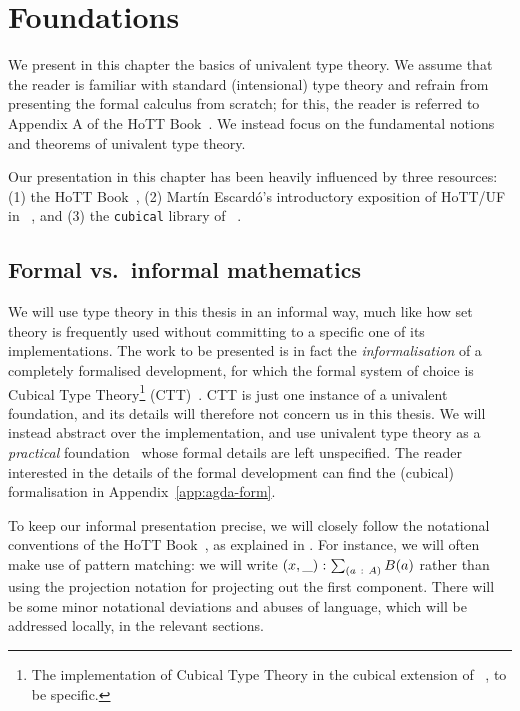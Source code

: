 \chapter{Foundations}\label{chap:foundations}

We present in this chapter the basics of univalent type theory. We assume that the reader
is familiar with standard (intensional) type theory and refrain from presenting the formal
calculus from scratch; for this, the reader is referred to Appendix A of the HoTT
Book~\cite{hottbook}. We instead focus on the fundamental notions and theorems of
univalent type theory.

Our presentation in this chapter has been heavily influenced by three resources: (1) the
HoTT Book~\cite{hottbook}, (2) Martín Escardó's introductory exposition of HoTT/UF in
\veragda{}~\cite{escardo-uf-intro}, and (3) the \texttt{cubical} library of
\veragda{}~\cite{agda-cubical}.

\section{Formal vs.~informal mathematics}

We will use type theory in this thesis in an informal way, much like how set theory is
frequently used without committing to a specific one of its implementations. The work to
be presented is in fact the \emph{informalisation} of a completely formalised development,
for which the formal system of choice is Cubical Type Theory\footnote{%
  The implementation of Cubical Type Theory in the cubical extension of
  \veragda{}~\cite{cubical-agda}, to be specific.
}
(CTT)~\cite{CCHM}. CTT is just one instance of a univalent foundation, and its details
will therefore not concern us in this thesis. We will instead abstract over the
implementation, and use univalent type theory as a \emph{practical}
foundation~\cite{PFOM, PFPL} whose formal details are left unspecified. The reader
interested in the details of the formal development can find the (cubical) \veragda{}
formalisation in Appendix~\ref{app:agda-form}.

To keep our informal presentation precise, we will closely follow the notational
conventions of the HoTT Book~\cite{hottbook}, as explained in
\cite[Sec.~I.1]{hottbook}. For instance, we will often make use of pattern matching: we
will write $(x, \_)\hspace{0.1mm}:\hspace{0.1mm}\sum_{(a~:~A)} B(a)$ rather than using the projection
notation for projecting out the first component. There will be some minor notational
deviations and abuses of language, which will be addressed locally, in the relevant
sections.

